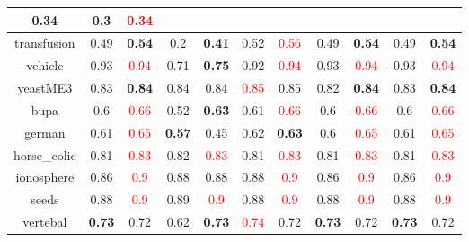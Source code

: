 \documentclass{article}%
\begin{document}
\begin{tabular}{c|cccccccccc}
{0.34
}&0.3&\textcolor{red}{ 
0.34
}\\%
\hline%
transfusion&0.49&\textbf{0.54}&0.2&\textbf{0.41}&0.52&\textcolor{red}{ 
0.56
}&0.49&\textbf{0.54}&0.49&\textbf{0.54}\\%
\hline%
vehicle&0.93&\textcolor{red}{ 
0.94
}&0.71&\textbf{0.75}&0.92&\textcolor{red}{ 
0.94
}&0.93&\textcolor{red}{ 
0.94
}&0.93&\textcolor{red}{ 
0.94
}\\%
\hline%
yeastME3&0.83&\textbf{0.84}&0.84&0.84&\textcolor{red}{ 
0.85
}&0.85&0.82&\textbf{0.84}&0.83&\textbf{0.84}\\%
\hline%
bupa&0.6&\textcolor{red}{ 
0.66
}&0.52&\textbf{0.63}&0.61&\textcolor{red}{ 
0.66
}&0.6&\textcolor{red}{ 
0.66
}&0.6&\textcolor{red}{ 
0.66
}\\%
\hline%
german&0.61&\textcolor{red}{ 
0.65
}&\textbf{0.57}&0.45&0.62&\textbf{0.63}&0.6&\textcolor{red}{ 
0.65
}&0.61&\textcolor{red}{ 
0.65
}\\%
\hline%
horse\_colic&0.81&\textcolor{red}{ 
0.83
}&0.82&\textcolor{red}{ 
0.83
}&0.81&\textcolor{red}{ 
0.83
}&0.81&\textcolor{red}{ 
0.83
}&0.81&\textcolor{red}{ 
0.83
}\\%
\hline%
ionosphere&0.86&\textcolor{red}{ 
0.9
}&0.88&0.88&0.88&\textcolor{red}{ 
0.9
}&0.86&\textcolor{red}{ 
0.9
}&0.86&\textcolor{red}{ 
0.9
}\\%
\hline%
seeds&0.88&\textcolor{red}{ 
0.9
}&0.89&\textcolor{red}{ 
0.9
}&0.88&\textcolor{red}{ 
0.9
}&0.88&\textcolor{red}{ 
0.9
}&0.88&\textcolor{red}{ 
0.9
}\\%
\hline%
vertebal&\textbf{0.73}&0.72&0.62&\textbf{0.73}&\textcolor{red}{ 
0.74
}&0.72&\textbf{0.73}&0.72&\textbf{0.73}&0.72\\%
\hline%
\end{tabular}

%
\end{document}
